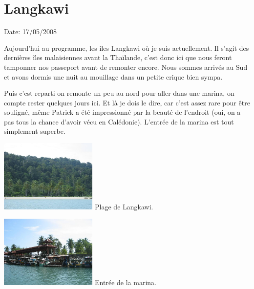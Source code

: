 \section{Langkawi}

Date: 17/05/2008

\begin{multicols}{2}

Aujourd'hui au programme, les iles Langkawi où je suis actuellement. Il s'agit des dernières îles malaisiennes avant la Thaïlande, c'est donc ici que nous feront tamponner nos passeport avant de remonter encore. Nous sommes arrivés au Sud et avons dormis une nuit au mouillage dans un petite crique bien sympa.


Puis c'est reparti on remonte un peu au nord pour aller dans une marina, on compte rester quelques jours ici. Et là je dois le dire, car c'est assez rare pour être souligné, même Patrick a été impressionné par la beauté de l'endroit (oui, on a pas tous la chance d'avoir vécu en Calédonie). L'entrée de la marina est tout simplement superbe.

\hspace*{-0.65cm}
\includegraphics[width=4.8cm]{articles/langkawi/1211018197eneE.jpg}
Plage de Langkawi.

\hspace*{-0.65cm}
\includegraphics[width=4.8cm]{articles/langkawi/1211018204F7Ee.jpg}
Entrée de la marina.


\end{multicols}
